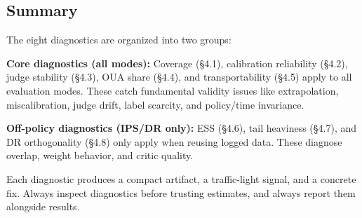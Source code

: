 \subsection{Summary}

The eight diagnostics are organized into two groups:

\textbf{Core diagnostics (all modes):} Coverage (§4.1), calibration reliability (§4.2), judge stability (§4.3), OUA share (§4.4), and transportability (§4.5) apply to all evaluation modes. These catch fundamental validity issues like extrapolation, miscalibration, judge drift, label scarcity, and policy/time invariance.

\textbf{Off-policy diagnostics (IPS/DR only):} ESS (§4.6), tail heaviness (§4.7), and DR orthogonality (§4.8) only apply when reusing logged data. These diagnose overlap, weight behavior, and critic quality.

Each diagnostic produces a compact artifact, a traffic-light signal, and a concrete fix. Always inspect diagnostics before trusting estimates, and always report them alongside results.
